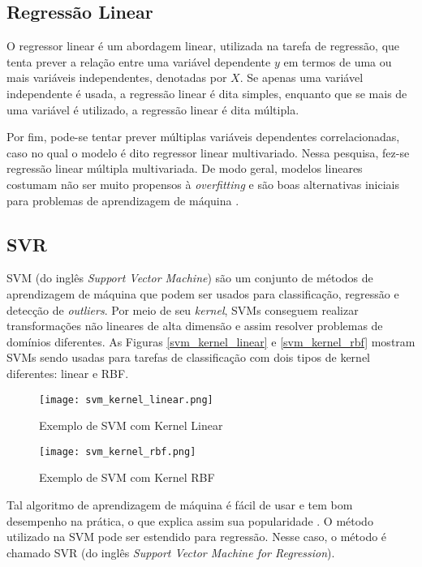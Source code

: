 \subsection{Regressão Linear}
O regressor linear é um abordagem linear, utilizada na tarefa de regressão, que tenta
prever a relação entre uma variável dependente $y$ em termos de uma ou mais variáveis
independentes, denotadas por $X$.
Se apenas uma variável independente é usada, a regressão linear é dita simples,
enquanto que se mais de uma variável é utilizado, a regressão linear é dita
múltipla. 
\par Por fim, pode-se tentar prever múltiplas variáveis dependentes
correlacionadas, caso no qual o modelo é dito regressor linear multivariado. Nessa
pesquisa, fez-se regressão linear múltipla multivariada. 
De modo geral, modelos lineares costumam não ser muito propensos à
\textit{overfitting} e são boas alternativas iniciais para problemas de aprendizagem
de máquina \cite{ml_book}. 

\subsection{SVR}
SVM (do inglês \textit{Support Vector Machine}) são um conjunto de métodos de
aprendizagem de máquina que podem ser usados para classificação, regressão e detecção
de \textit{outliers}. Por meio de seu \textit{kernel}, SVMs conseguem realizar
transformações não lineares de alta dimensão \cite{ml_second_book} e assim resolver
problemas de domínios diferentes. As Figuras \ref{svm_kernel_linear} e 
\ref{svm_kernel_rbf} mostram SVMs sendo
usadas para tarefas de classificação com dois tipos de kernel diferentes: linear e
RBF. 

\begin{figure}[!ht]
    \centering
    \texttt{[image: svm\_kernel\_linear.png]}
    \caption{Exemplo de SVM com Kernel Linear}
\end{figure}

\begin{figure}[!ht]
    \centering
    \texttt{[image: svm\_kernel\_rbf.png]}
    \caption{Exemplo de SVM com Kernel RBF}
\end{figure}

\par Tal algoritmo de
aprendizagem de máquina é fácil de usar e tem bom desempenho na prática, o que
explica assim sua popularidade \cite{ml_second_book}. O método utilizado na SVM pode ser
estendido para regressão. Nesse caso, o método é chamado SVR (do inglês
\textit{Support Vector Machine for Regression}). 

